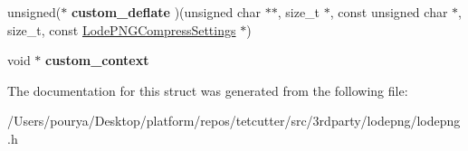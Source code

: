 \begin{DoxyCompactItemize}
\item 
\hypertarget{structLodePNGCompressSettings_a55dafebbbe017806fb2bbc32bb40a59b}{}unsigned($\ast$ {\bfseries custom\+\_\+deflate} )(unsigned char $\ast$$\ast$, size\+\_\+t $\ast$, const unsigned char $\ast$, size\+\_\+t, const \hyperlink{structLodePNGCompressSettings}{Lode\+P\+N\+G\+Compress\+Settings} $\ast$)\label{structLodePNGCompressSettings_a55dafebbbe017806fb2bbc32bb40a59b}

\item 
\hypertarget{structLodePNGCompressSettings_a04bda70a2bfb3ca23b26223405c4dd22}{}void $\ast$ {\bfseries custom\+\_\+context}\label{structLodePNGCompressSettings_a04bda70a2bfb3ca23b26223405c4dd22}

\end{DoxyCompactItemize}


The documentation for this struct was generated from the following file\+:\begin{DoxyCompactItemize}
\item 
/\+Users/pourya/\+Desktop/platform/repos/tetcutter/src/3rdparty/lodepng/lodepng.\+h\end{DoxyCompactItemize}
